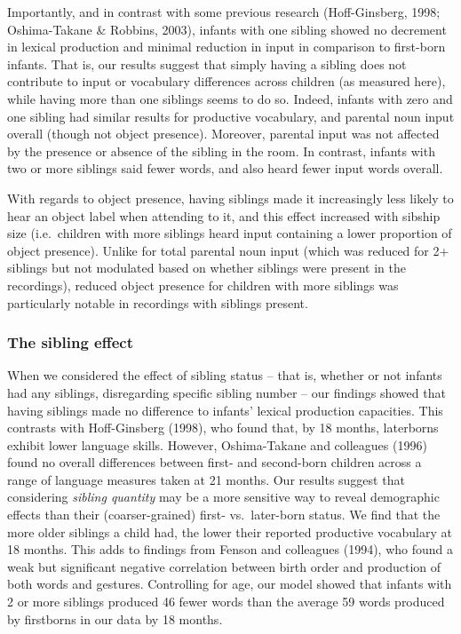 \documentclass[
  man,mask,floatsintext]{apa6}
\begin{document}
Importantly, and in contrast with some previous research (Hoff-Ginsberg, 1998; Oshima-Takane \& Robbins, 2003), infants with one sibling showed no decrement in lexical production and minimal reduction in input in comparison to first-born infants. That is, our results suggest that simply having a sibling does not contribute to input or vocabulary differences across children (as measured here), while having more than one siblings seems to do so. Indeed, infants with zero and one sibling had similar results for productive vocabulary, and parental noun input overall (though not object presence). Moreover, parental input was not affected by the presence or absence of the sibling in the room. In contrast, infants with two or more siblings said fewer words, and also heard fewer input words overall.

With regards to object presence, having siblings made it increasingly less likely to hear an object label when attending to it, and this effect increased with sibship size (i.e.~children with more siblings heard input containing a lower proportion of object presence). Unlike for total parental noun input (which was reduced for 2+ siblings but not modulated based on whether siblings were present in the recordings), reduced object presence for children with more siblings was particularly notable in recordings with siblings present.

\hypertarget{the-sibling-effect}{%
\subsubsection{The sibling effect}\label{the-sibling-effect}}

When we considered the effect of sibling status -- that is, whether or not infants had any siblings, disregarding specific sibling number -- our findings showed that having siblings made no difference to infants' lexical production capacities. This contrasts with Hoff-Ginsberg (1998), who found that, by 18 months, laterborns exhibit lower language skills. However, Oshima-Takane and colleagues (1996) found no overall differences between first- and second-born children across a range of language measures taken at 21 months. Our results suggest that considering \emph{sibling quantity} may be a more sensitive way to reveal demographic effects than their (coarser-grained) first- vs.~later-born status. We find that the more older siblings a child had, the lower their reported productive vocabulary at 18 months. This adds to findings from Fenson and colleagues (1994), who found a weak but significant negative correlation between birth order and production of both words and gestures. Controlling for age, our model showed that infants with 2 or more siblings produced 46 fewer words than the average 59 words produced by firstborns in our data by 18 months.
\end{document}
